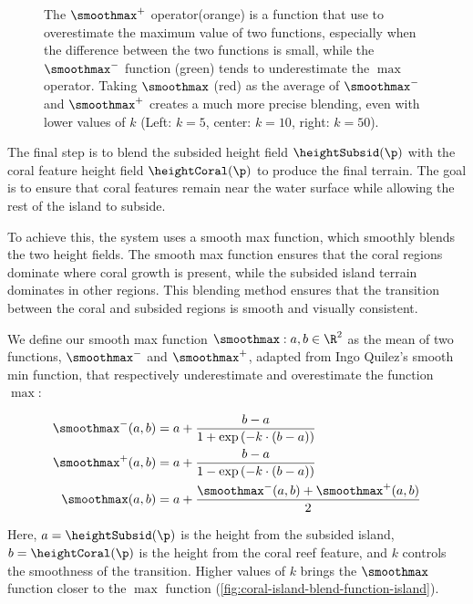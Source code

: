 \begin{figure}[H]
    \caption{The $\smoothmax^+$ operator(orange) is a function that use to overestimate the maximum value of two functions, especially when the difference between the two functions is small, while the $\smoothmax^-$ function (green) tends to underestimate the $\max$ operator. Taking $\smoothmax$ (red) as the average of $\smoothmax^-$ and $\smoothmax^+$ creates a much more precise blending, even with lower values of $k$ (Left: $k=5$, center: $k=10$, right: $k=50$).}
    \label{fig:coral-island-blend-function-island-with-upper}
\end{figure}

The final step is to blend the subsided height field $\heightSubsid(\p)$ with the coral feature height field $\heightCoral(\p)$ to produce the final terrain. The goal is to ensure that coral features remain near the water surface while allowing the rest of the island to subside.

To achieve this, the system uses a smooth max function, which smoothly blends the two height fields. The smooth max function ensures that the coral regions dominate where coral growth is present, while the subsided island terrain dominates in other regions. This blending method ensures that the transition between the coral and subsided regions is smooth and visually consistent.

We define our smooth max function $\smoothmax: a, b \in \R^2$ as the mean of two functions, $\smoothmax^-$ and $\smoothmax^+$, adapted from Ingo Quilez's smooth min function, that respectively underestimate and overestimate the function $\max$:

\begin{align}
    \smoothmax^-(a, b) &= a + \frac{b - a}{1 + \exp\left(-k \cdot (b - a) \right)} \\
    \smoothmax^+(a, b) &= a + \frac{b - a}{1 - \exp\left(-k \cdot (b - a) \right)} \\
    \smoothmax(a, b)   &= a + \frac{\smoothmax^-(a, b) + \smoothmax^+(a, b)}{2} %
\end{align}

Here, $a = \heightSubsid(\p)$ is the height from the subsided island, $b = \heightCoral(\p)$ is the height from the coral reef feature, and $k$ controls the smoothness of the transition. Higher values of $k$ brings the $\smoothmax$ function closer to the $\max$ function (\cref{fig:coral-island-blend-function-island}).

